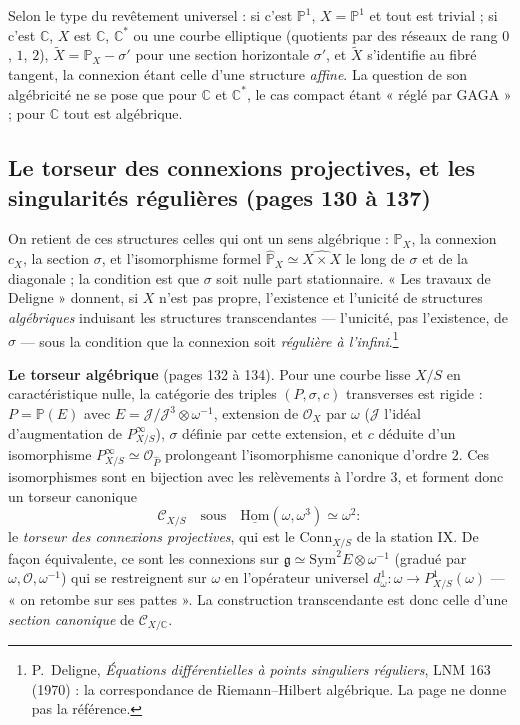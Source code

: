 \documentclass[11pt,a4paper]{article}
\begin{document}
Selon le type du revêtement universel : si c'est $\mathbb{P}^1$, $X =
\mathbb{P}^1$ et tout est trivial ; si c'est $\mathbb{C}$, $X$ est $\mathbb{C}$,
$\mathbb{C}^*$ ou une courbe elliptique (quotients par des réseaux de rang
$0$, $1$, $2$), $\widetilde{X} = \mathbb{P}_X - \sigma'$ pour une section
horizontale $\sigma'$, et $\widetilde{X}$ s'identifie au fibré tangent, la
connexion étant celle d'une structure \emph{affine}. La question de son
algébricité ne se pose que pour $\mathbb{C}$ et $\mathbb{C}^*$, le cas compact
étant « réglé par GAGA » ; pour $\mathbb{C}$ tout est algébrique.

\subsection*{Le torseur des connexions projectives, et les singularités régulières (pages 130 à 137)}

On retient de ces structures celles qui ont un sens algébrique :
$\mathbb{P}_X$, la connexion $c_X$, la section $\sigma$, et l'isomorphisme
formel $\widehat{\mathbb{P}}_X \simeq \widehat{X \times X}$ le long de $\sigma$
et de la diagonale ; la condition est que $\sigma$ soit nulle part
stationnaire. « Les travaux de Deligne » donnent, si $X$ n'est pas propre,
l'existence et l'unicité de structures \emph{algébriques} induisant les
structures transcendantes — l'unicité, pas l'existence, de $\sigma$ — sous la
condition que la connexion soit \emph{régulière à l'infini}.\footnote{P.~Deligne,
\emph{Équations différentielles à points singuliers réguliers}, LNM 163
(1970) : la correspondance de Riemann--Hilbert algébrique. La page ne donne
pas la référence.}

\textbf{Le torseur algébrique} (pages 132 à 134). Pour une courbe lisse $X/S$
en caractéristique nulle, la catégorie des triples $(P, \sigma, c)$
transverses est rigide : $P = \mathbb{P}(E)$ avec $E = \mathcal{J}/\mathcal{J}^3 \otimes
\omega^{-1}$, extension de $\mathcal{O}_X$ par $\omega$ ($\mathcal{J}$ l'idéal
d'augmentation de $P^\infty_{X/S}$), $\sigma$ définie par cette extension, et
$c$ déduite d'un isomorphisme $P^\infty_{X/S} \simeq \mathcal{O}_{\hat P}$
prolongeant l'isomorphisme canonique d'ordre $2$. Ces isomorphismes sont en
bijection avec les relèvements à l'ordre $3$, et forment donc un torseur
canonique
\[
  \mathcal{C}_{X/S} \quad\text{sous}\quad
  \underline{\mathrm{Hom}}(\omega, \omega^3) \simeq \omega^2 :
\]
le \emph{torseur des connexions projectives}, qui est le
$\mathrm{Conn}_{X/S}$ de la station IX. De façon équivalente, ce sont les
connexions sur $\mathfrak{g} \simeq \mathrm{Sym}^2 E \otimes \omega^{-1}$ (gradué
par $\omega, \mathcal{O}, \omega^{-1}$) qui se restreignent sur $\omega$ en
l'opérateur universel $d^1_\omega : \omega \to P^1_{X/S}(\omega)$ — « on
retombe sur ses pattes ». La construction transcendante est donc celle d'une
\emph{section canonique} de $\mathcal{C}_{X/\mathbb{C}}$.
\end{document}
